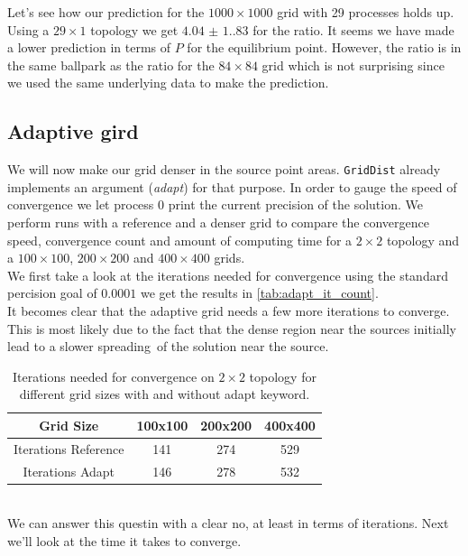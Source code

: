 Let's see how our prediction for the $1000\times1000$ grid with 29 processes holds up. Using a $29\times1$ topology we get $\num{4.04(1.83)}$ for the ratio. It seems we have made a lower prediction in terms of $P$ for the equilibrium point. However, the ratio is in the same ballpark as the ratio for the $84\times84$ grid which is not surprising since we used the same underlying data to make the prediction.\\
\subsection{Adaptive gird}
We will now make our grid denser in the source point areas. \texttt{GridDist} already implements an argument (\textit{adapt}) for that purpose. In order to gauge the speed of convergence we let process 0 print the current precision of the solution. We perform runs with a reference and a denser grid to compare the convergence speed, convergence count and amount of computing time for a $2\times2$ topology and a $100\times100$, $200\times200$ and $400\times400$ grids.\\
We first take a look at the iterations needed for convergence using the standard percision goal of $0.0001$ we get the results in \autoref{tab:adapt_it_count}.\\
It becomes clear that the adaptive grid needs a few more iterations to converge. This is most likely due to the fact that the dense region near the sources initially lead to a slower \glq spreading\grq\, of the solution near the source.\\
\begin{table}[H]
    \centering
    \caption{Iterations needed for convergence on $2\times2$ topology for different grid sizes with and without adapt keyword.}
    \label{tab:adapt_it_count}
    \begin{tabular}{|c|c|c|c|}
        \hline
        {{{Grid Size}}} & {100x100} & {200x200} & {400x400} \\\hline
        {Iterations Reference} & 141 & 274 & 529 \\\hline
        {Iterations Adapt} &     146 & 278 & 532 \\\hline
    \end{tabular}
\end{table}
\\
We can answer this questin with a clear no, at least in terms of iterations. Next we'll look at the time it takes to converge.\\

